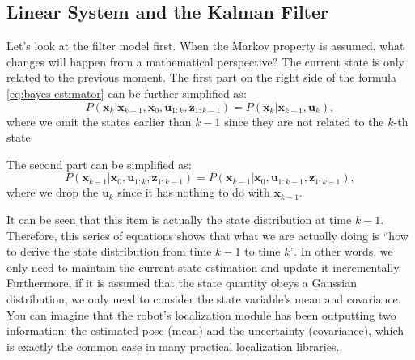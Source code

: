 \subsection{Linear System and the Kalman Filter}
Let's look at the filter model first. When the Markov property is assumed, what changes will happen from a mathematical perspective? The current state is only related to the previous moment. The first part on the right side of the formula \eqref{eq:bayes-estimator} can be further simplified as:
\begin{equation}
	P\left( {{\mathbf{x}_k}|{\mathbf{x}_{k - 1}},{\mathbf{x}_0},{\mathbf{u}_{1:k}},{\mathbf{z}_{1:k - 1}}} \right) = P\left( {{\mathbf{x}_k}|{\mathbf{x}_{k - 1}},{\mathbf{u}_k}} \right),
\end{equation}
where we omit the states earlier than $k-1$ since they are not related to the $k$-th state. 

The second part can be simplified as: 
\begin{equation}
	P\left( {{\mathbf{x}_{k - 1}}|{\mathbf{x}_0},{\mathbf{u}_{1:k}},{\mathbf{z}_{1:k - 1}}} \right) = P\left( {{\mathbf{x}_{k - 1}}|{\mathbf{x}_0},{\mathbf{u}_{1:k - 1}},{\mathbf{z}_{1:k - 1}}} \right),
\end{equation}
where we drop the $\mathbf{u}_k$ since it has nothing to do with $\mathbf{x}_{k-1}$. 

It can be seen that this item is actually the state distribution at time $k-1$. Therefore, this series of equations shows that what we are actually doing is ``how to derive the state distribution from time $k-1$ to time $k$''. In other words, we only need to maintain the current state estimation and update it incrementally. Furthermore, if it is assumed that the state quantity obeys a Gaussian distribution, we only need to consider the state variable's mean and covariance. You can imagine that the robot's localization module has been outputting two information: the estimated pose (mean) and the uncertainty (covariance), which is exactly the common case in many practical localization libraries.

